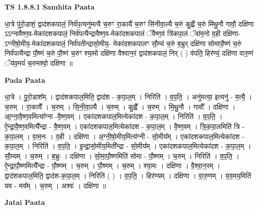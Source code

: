 \documentclass[17pt]{extarticle}
\begin{document}
\textbf{TS 1.8.8.1 } \newline
\textbf{Samhita Paata} \newline

धा॒त्रे पु॑रो॒डाशं॒ द्वाद॑शकपालं॒ निर्व॑प॒त्यनु॑मत्यै च॒रुꣳ रा॒कायै॑ च॒रुꣳ सि॑नीवा॒ल्यै च॒रुं कु॒ह्वै॑ च॒रुं मि॑थु॒नौ गावौ॒ दक्षि॑णा ऽऽग्नावैष्ण॒व-मेका॑दशकपालं॒ निर्व॑पत्यैन्द्रावैष्ण॒व-मेका॑दशकपालं ॅवैष्ण॒वं त्रि॑कपा॒लं ॅवा॑म॒नो व॒ही दक्षि॑णा-ऽग्नीषो॒मीय॒-मेका॑दशकपालं॒ निर्व॑पतीन्द्रासो॒मीय॒- मेका॑दशकपालꣳ सौ॒म्यं च॒रुं ब॒भ्रुर् दक्षि॑णा सोमापौ॒ष्णं च॒रुं निर्व॑पत्यैन्द्रा पौ॒ष्णं च॒रुं पौ॒ष्णं च॒रुꣳ श्या॒मो दक्षि॑णा वैश्वान॒रं द्वाद॑शकपालं॒ निर् ( ) व॑पति॒ हिर॑ण्यं॒ दक्षि॑णा वारु॒णं ॅय॑व॒मयं॑ च॒रुमश्वो॒ दक्षि॑णा ॥ \newline

\textbf{Pada Paata} \newline

धा॒त्रे । पु॒रो॒डाश᳚म् । द्वाद॑शकपाल॒मिति॒ द्वाद॑श - क॒पा॒ल॒म् । निरिति॑ । व॒प॒ति॒ । अनु॑मत्या॒ इत्यनु॑ - म॒त्यै॒ । च॒रुम् । रा॒कायै᳚ । च॒रुम् । सि॒नी॒वा॒ल्यै । च॒रुम् । कु॒ह्वै᳚ । च॒रुम् । मि॒थु॒नौ । गावौ᳚ । दक्षि॑णा । आ॒ग्ना॒वै॒ष्ण॒वमित्या᳚ग्ना -वै॒ष्ण॒वम् । एका॑दशकपाल॒मित्येका॑दश - क॒पा॒ल॒म् । निरिति॑ । व॒प॒ति॒ । ऐ॒न्द्रा॒वै॒ष्ण॒वमित्यै᳚न्द्रा - वै॒ष्ण॒वम् । एका॑दशकपाल॒मित्येका॑दश - क॒पा॒ल॒म् । वै॒ष्ण॒वम् । त्रि॒क॒पा॒लमिति॑ त्रि - क॒पा॒लम् । वा॒म॒नः । व॒ही । दक्षि॑णा । अ॒ग्नी॒षो॒मीय॒मित्य॑ग्नी - सो॒मीय᳚म् । एका॑दशकपाल॒मित्येका॑दश - क॒पा॒ल॒म् । निरिति॑ । व॒प॒ति॒ । इ॒न्द्रा॒सो॒मीय॒मिती᳚न्द्रा - सो॒मीय᳚म् । एका॑दशकपाल॒मित्येका॑दश - क॒पा॒ल॒म् । सौ॒म्यम् । च॒रुम् । ब॒भ्रुः । दक्षि॑णा । सो॒मा॒पौ॒ष्णमिति॑ सोमा - पौ॒ष्णम् । च॒रुम् । निरिति॑ । व॒प॒ति॒ । ऐ॒न्द्रा॒पौ॒ष्णमित्यै᳚न्द्रा - पौ॒ष्णम् । च॒रुम् । पौ॒ष्णम् । च॒रुम् । श्या॒मः । दक्षि॑णा । वै॒श्वा॒न॒रम् । द्वाद॑शकपाल॒मिति॒ द्वाद॑श-क॒पा॒ल॒म् । निरिति॑ ( ) । व॒प॒ति॒ । हिर॑ण्यम् । दक्षि॑णा । वा॒रु॒णम् । य॒व॒मय॒मिति॑ यव - मय᳚म् । च॒रुम् । अश्वः॑ । दक्षि॑णा ॥  \newline



\textbf{Jatai Paata} \newline
\end{document}
